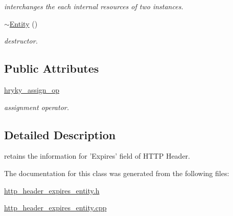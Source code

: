 \begin{DoxyCompactItemize}
\begin{DoxyCompactList}\small\item\em interchanges the each internal resources of two instances. \end{DoxyCompactList}\item 
\hypertarget{classhryky_1_1http_1_1header_1_1expires_1_1_entity_a3f7eda6bcc29ebf524a2f8564d7e5c52}{\hyperlink{classhryky_1_1http_1_1header_1_1expires_1_1_entity_a3f7eda6bcc29ebf524a2f8564d7e5c52}{$\sim$\-Entity} ()}\label{classhryky_1_1http_1_1header_1_1expires_1_1_entity_a3f7eda6bcc29ebf524a2f8564d7e5c52}

\begin{DoxyCompactList}\small\item\em destructor. \end{DoxyCompactList}\end{DoxyCompactItemize}
\subsection*{Public Attributes}
\begin{DoxyCompactItemize}
\item 
\hypertarget{classhryky_1_1http_1_1header_1_1expires_1_1_entity_a425a62d0dc9a59c33eeb93871b872bf8}{\hyperlink{classhryky_1_1http_1_1header_1_1expires_1_1_entity_a425a62d0dc9a59c33eeb93871b872bf8}{hryky\-\_\-assign\-\_\-op}}\label{classhryky_1_1http_1_1header_1_1expires_1_1_entity_a425a62d0dc9a59c33eeb93871b872bf8}

\begin{DoxyCompactList}\small\item\em assignment operator. \end{DoxyCompactList}\end{DoxyCompactItemize}


\subsection{Detailed Description}
retains the information for 'Expires' field of H\-T\-T\-P Header. 

The documentation for this class was generated from the following files\-:\begin{DoxyCompactItemize}
\item 
\hyperlink{http__header__expires__entity_8h}{http\-\_\-header\-\_\-expires\-\_\-entity.\-h}\item 
\hyperlink{http__header__expires__entity_8cpp}{http\-\_\-header\-\_\-expires\-\_\-entity.\-cpp}\end{DoxyCompactItemize}
